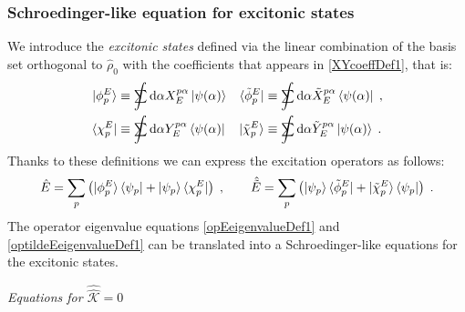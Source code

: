 \documentclass[a4paper]{article}
\newcommand{\dd}{{\rm d}}
\newcommand{\sint}{\mathrlap{\displaystyle\int}
\mathrlap{\textstyle\sum}
\phantom{\mathrlap{\displaystyle
\int}\textstyle\sum}}
\newcommand{\be}{\begin{equation}}
\newcommand{\ee}{\end{equation}}
\newcommand{\nn}{\notag}
\newcommand{\qq}{\qquad}
\newcommand{\lb}{\label}
\newcommand{\op}[1]{\hat {#1}}
\newcommand{\sop}[1]{\op{\op {#1}}}
\newcommand{\tket}[1]{| \tilde #1 \rangle}
\newcommand{\tbra}[1]{\langle \tilde #1 |}
\newcommand{\dmnot}{\op{\rho}_0}
\newcommand{\coupl}{\sop{\mathcal K}}
\begin{document}
\subsubsection{Schroedinger-like equation for excitonic states}

We introduce the \emph{excitonic states} defined via the linear combination of the basis set orthogonal to $\dmnot$ with the
coefficients that appears in \eqref{XYcoeffDef1}, that is:
\begin{align}\lb{ExcitonicStatesDef1}
\ket{\phi^E_p} &\equiv \sint \dd \alpha X_{E}^{p \alpha} \ket{\psi(\alpha)} &
\tbra{\phi^E_p} &\equiv \sint \dd \alpha {\tilde X_{E}^{p \alpha}} \bra{\psi(\alpha)} \;, \nn\\
\bra{\chi^E_p} &\equiv \sint \dd \alpha  Y_{E}^{p \alpha} \bra{\psi(\alpha)} &
\tket{\chi^E_p} &\equiv \sint \dd \alpha {\tilde Y}_{E}^{p\alpha} \ket{\psi(\alpha)} \;.
\end{align}
Thanks to these definitions we can express the excitation operators as follows:
\be\lb{ExctitationOperatorsDef2}
\op E = \sum_p \left( \ket{\phi^E_p}\bra{\psi_p} + \ket{\psi_p} \bra{\chi^E_p}\right)\;, \qq
\op {\tilde E} = \sum_p \left( \ket{\psi_p} \tbra{\phi^E_p} + \tket{\chi^E_p}\bra{\psi_p} \right)\;.
\ee
The operator eigenvalue equations \eqref{opEeigenvalueDef1} and \eqref{optildeEeigenvalueDef1} can be translated into a Schroedinger-like equations
for the excitonic states. 

\vspace{0.5cm}
\emph{Equations for $\coupl = 0$}
\vspace{0.5cm}
\end{document}
